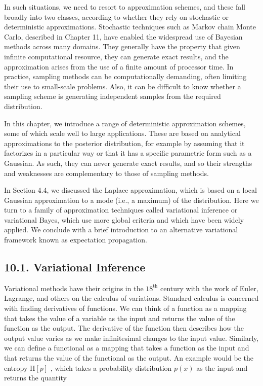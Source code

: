 \documentclass[
  10
]{article}
\begin{document}
In such situations, we need to resort to approximation schemes, and
these fall broadly into two classes, according to whether they rely on
stochastic or deterministic approximations. Stochastic techniques such
as Markov chain Monte Carlo, described in Chapter 11, have enabled the
widespread use of Bayesian methods across many domains. They generally
have the property that given infinite computational resource, they can
generate exact results, and the approximation arises from the use of a
finite amount of processor time. In practice, sampling methods can be
computationally demanding, often limiting their use to small-scale
problems. Also, it can be difficult to know whether a sampling scheme is
generating independent samples from the required distribution.

In this chapter, we introduce a range of deterministic approximation
schemes, some of which scale well to large applications. These are based
on analytical approximations to the posterior distribution, for example
by assuming that it factorizes in a particular way or that it has a
specific parametric form such as a Gaussian. As such, they can never
generate exact results, and so their strengths and weaknesses are
complementary to those of sampling methods.

In Section 4.4, we discussed the Laplace approximation, which is based
on a local Gaussian approximation to a mode (i.e., a maximum) of the
distribution. Here we turn to a family of approximation techniques
called variational inference or variational Bayes, which use more global
criteria and which have been widely applied. We conclude with a brief
introduction to an alternative variational framework known as
expectation propagation.

\subsection{10.1. Variational Inference}\label{variational-inference}

Variational methods have their origins in the
\(1 8 ^ { \mathrm { t h } }\) century with the work of Euler, Lagrange,
and others on the calculus of variations. Standard calculus is concerned
with finding derivatives of functions. We can think of a function as a
mapping that takes the value of a variable as the input and returns the
value of the function as the output. The derivative of the function then
describes how the output value varies as we make infinitesimal changes
to the input value. Similarly, we can define a functional as a mapping
that takes a function as the input and that returns the value of the
functional as the output. An example would be the entropy
\(\mathrm { H } [ p ]\) , which takes a probability distribution
\(p ( x )\) as the input and returns the quantity
\end{document}
